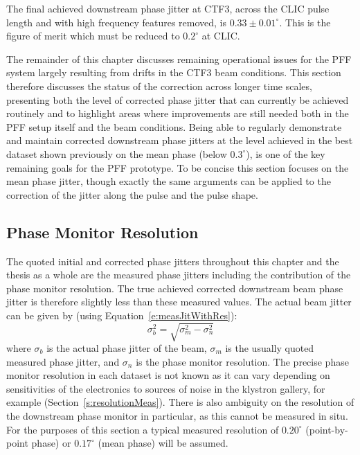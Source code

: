 The final achieved downstream phase jitter at CTF3, across the CLIC pulse length and with high frequency features removed, is \(0.33\pm0.01^\circ\). This is the figure of merit which must be reduced to \(0.2^\circ\) at CLIC. 


The remainder of this chapter discusses remaining operational issues for the PFF system largely resulting from drifts in the CTF3 beam conditions. This section therefore discusses the status of the correction across longer time scales, presenting both the level of corrected phase jitter that can currently be achieved routinely and to highlight areas where improvements are still needed both in the PFF setup itself and the beam conditions. Being able to regularly demonstrate and maintain corrected downstream phase jitters at the level achieved in the best dataset shown previously on the mean phase (below \(0.3^\circ\)), is one of the key remaining goals for the PFF prototype. To be concise this section focuses on the mean phase jitter, though exactly the same arguments can be applied to the correction of the jitter along the pulse and the pulse shape.

\subsection{Phase Monitor Resolution}
\label{ss:longFF_phMonRes}

The quoted initial and corrected phase jitters throughout this chapter and the thesis as a whole are the measured phase jitters including the contribution of the phase monitor resolution. The true achieved corrected downstream beam phase jitter is therefore slightly less than these measured values. The actual beam jitter can be given by (using Equation~\ref{e:measJitWithRes}):
\begin{equation}
\sigma_b^2 = \sqrt{\sigma_m^2 - \sigma_n^2}
\end{equation}
where \(\sigma_b\) is the actual phase jitter of the beam, \(\sigma_m\) is the usually quoted measured phase jitter, and \(\sigma_n\) is the phase monitor resolution. The precise phase monitor resolution in each dataset is not known as it can vary depending on sensitivities of the electronics to sources of noise in the klystron gallery, for example (Section~\ref{s:resolutionMeas}). There is also ambiguity on the resolution of the downstream phase monitor in particular, as this cannot be measured in situ. For the purposes of this section a typical measured resolution of \(0.20^\circ\) (point-by-point phase) or \(0.17^\circ\) (mean phase) will be assumed.

